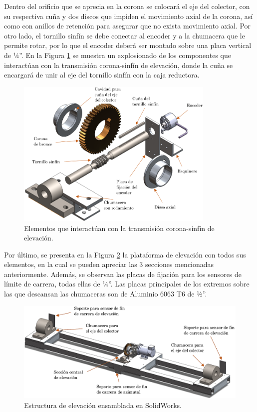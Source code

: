 Dentro del orificio que se aprecia en la corona se colocará el eje del colector, con su respectiva cuña y dos discos que impiden el movimiento axial de la corona, así como con anillos de retención para asegurar que no exista movimiento axial. Por otro lado, el tornillo sinfín se debe conectar al encoder y a la chumacera que le permite rotar, por lo que el encoder deberá ser montado sobre una placa vertical de ¼”. En la Figura \ref{fig:ele3} se muestra un explosionado de los componentes que interactúan con la transmisión corona-sinfín de elevación, donde la cuña se encargará de unir al eje del tornillo sinfín con la caja reductora.

\begin{figure}[H]
	\centering
	\includegraphics[width=9.5cm]{imagenes/ele3}
	\caption{Elementos que interactúan con la transmisión corona-sinfín de elevación.}
	\label{fig:ele3}
\end{figure}

\newpage
Por último, se presenta en la Figura \ref{fig:ele4} la plataforma de elevación con todos sus elementos, en la cual se pueden apreciar las 3 secciones mencionadas anteriormente. Además, se observan las placas de fijación para los sensores de límite de carrera, todas ellas de ¼”. Las placas principales de los extremos sobre las que descansan las chumaceras son de Aluminio 6063 T6 de ½”.

\begin{figure}[H]
	\centering
	\includegraphics[width=\columnwidth]{imagenes/ele4}
	\caption{Estructura de elevación ensamblada en SolidWorks.}
	\label{fig:ele4}
\end{figure}

